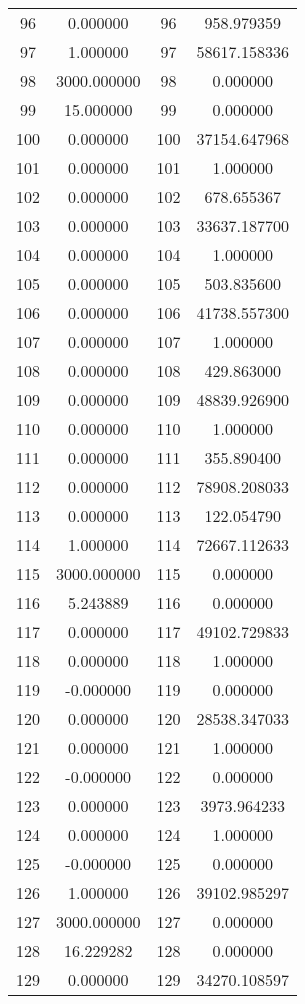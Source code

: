\documentclass[12pt]{article}
\begin{document}
\begin{longtable}{@{}cccc@{}}
96 & 0.000000 & 96 & 958.979359 \\
97 & 1.000000 & 97 & 58617.158336 \\
98 & 3000.000000 & 98 & 0.000000 \\
99 & 15.000000 & 99 & 0.000000 \\
100 & 0.000000 & 100 & 37154.647968 \\
101 & 0.000000 & 101 & 1.000000 \\
102 & 0.000000 & 102 & 678.655367 \\
103 & 0.000000 & 103 & 33637.187700 \\
104 & 0.000000 & 104 & 1.000000 \\
105 & 0.000000 & 105 & 503.835600 \\
106 & 0.000000 & 106 & 41738.557300 \\
107 & 0.000000 & 107 & 1.000000 \\
108 & 0.000000 & 108 & 429.863000 \\
109 & 0.000000 & 109 & 48839.926900 \\
110 & 0.000000 & 110 & 1.000000 \\
111 & 0.000000 & 111 & 355.890400 \\
112 & 0.000000 & 112 & 78908.208033 \\
113 & 0.000000 & 113 & 122.054790 \\
114 & 1.000000 & 114 & 72667.112633 \\
115 & 3000.000000 & 115 & 0.000000 \\
116 & 5.243889 & 116 & 0.000000 \\
117 & 0.000000 & 117 & 49102.729833 \\
118 & 0.000000 & 118 & 1.000000 \\
119 & -0.000000 & 119 & 0.000000 \\
120 & 0.000000 & 120 & 28538.347033 \\
121 & 0.000000 & 121 & 1.000000 \\
122 & -0.000000 & 122 & 0.000000 \\
123 & 0.000000 & 123 & 3973.964233 \\
124 & 0.000000 & 124 & 1.000000 \\
125 & -0.000000 & 125 & 0.000000 \\
126 & 1.000000 & 126 & 39102.985297 \\
127 & 3000.000000 & 127 & 0.000000 \\
128 & 16.229282 & 128 & 0.000000 \\
129 & 0.000000 & 129 & 34270.108597 \\

\end{longtable}
\end{document}
